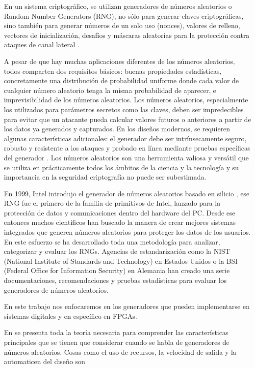     En un sistema criptográfico, se utilizan generadores de números aleatorios o Random Number Generators (RNG), no sólo para generar claves criptográficas, sino también para generar números de un solo uso (nonces), valores de relleno, vectores de inicialización, desafíos y máscaras aleatorias para la protección contra ataques de canal lateral \cite{Petura2016}.

    A pesar de que hay muchas aplicaciones diferentes de los números aleatorios, todos comparten dos requisitos básicos: buenas propiedades estadísticas, concretamente una distribución de probabilidad uniforme donde cada valor de cualquier número aleatorio tenga la misma probabilidad de aparecer, e imprevisibilidad de los números aleatorios. Los números aleatorios, especialmente los utilizados para parámetros secretos como las claves, deben ser impredecibles para evitar que un atacante pueda calcular valores futuros o anteriores a partir de los datos ya generados y capturados. En los diseños modernos, se requieren algunas características adicionales: el generador debe ser intrínsecamente seguro, robusto y resistente a los ataques y probado en línea mediante pruebas específicas del generador \cite{Badrignans2011}. Los números aleatorios son una herramienta valiosa y versátil que se utiliza en prácticamente todos los ámbitos de la ciencia y la tecnología y su importancia en la seguridad criptografía no puede ser subestimada.

    En 1999, Intel introdujo el generador de números aleatorios basado en silicio \cite{Jun1999}, ese RNG fue el primero de la familia de primitivos de Intel, lanzado para la protección de datos y comunicaciones dentro del hardware del PC. Desde ese entonces muchos científicos han buscado la manera de crear mejores sistemas integrados que generen números aleatorios para proteger los datos de los usuarios. En este esfuerzo se ha desarrollado toda una metodología para analizar, categorizar y evaluar los RNGs. Agencias de estandarización como la NIST (National Institute of Standards and Technology) \cite{Turan2018} en Estados Unidos o la BSI (Federal Office for Information Security) \cite{AIS2011} en Alemania han creado una serie documentaciones, recomendaciones y pruebas estadísticas para evaluar los generadores de números aleatorios.



    En este trabajo nos enfocaremos en los generadores que pueden implementarse en sistemas digitales y en específico en FPGAs. 

    En \cite{Badrignans2011} se presenta toda la teoría necesaria para comprender las características principales que se tienen que considerar cuando se habla de generadores de números aleatorios. Cosas como el uso de recursos, la velocidad de salida y la automaticen del diseño son 

